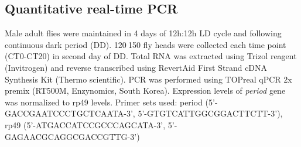 \subsection*{Quantitative real-time PCR}

Male adult flies were maintained in 4 days of 12h:12h LD cycle and following continuous dark period (DD). 120$~$150 fly heads were collected each time point (CT0-CT20) in second day of DD.
Total RNA was extracted using Trizol reagent (Invitrogen) and reverse transcribed using RevertAid First Strand cDNA Synthesis Kit (Thermo scientific).
PCR was performed using TOPreal qPCR 2x premix (RT500M, Enzynomics, South Korea). Expression levels of \emph{period} gene was normalized to rp49 levels.
Primer sets used: period (5'-GACCGAATCCCTGCTCAATA-3', 5'-GTGTCATTGGCGGACTTCTT-3'), rp49 (5'-ATGACCATCCGCCCAGCATA-3', 5'-GAGAACGCAGGCGACCGTTG-3')
    
  
  
  